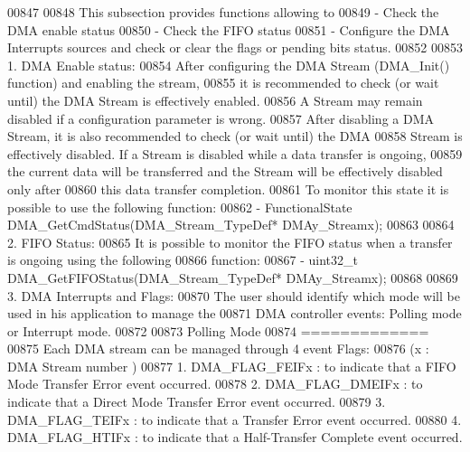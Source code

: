\begin{DoxyCode}
00847 \textcolor{comment}{}
00848 \textcolor{comment}{  This subsection provides functions allowing to}
00849 \textcolor{comment}{   - Check the DMA enable status}
00850 \textcolor{comment}{   - Check the FIFO status }
00851 \textcolor{comment}{   - Configure the DMA Interrupts sources and check or clear the flags or pending bits status.   }
00852 \textcolor{comment}{   }
00853 \textcolor{comment}{ 1. DMA Enable status:}
00854 \textcolor{comment}{   After configuring the DMA Stream (DMA\_Init() function) and enabling the stream,}
00855 \textcolor{comment}{   it is recommended to check (or wait until) the DMA Stream is effectively enabled.}
00856 \textcolor{comment}{   A Stream may remain disabled if a configuration parameter is wrong.}
00857 \textcolor{comment}{   After disabling a DMA Stream, it is also recommended to check (or wait until) the DMA}
00858 \textcolor{comment}{   Stream is effectively disabled. If a Stream is disabled while a data transfer is ongoing, }
00859 \textcolor{comment}{   the current data will be transferred and the Stream will be effectively disabled only after}
00860 \textcolor{comment}{   this data transfer completion.}
00861 \textcolor{comment}{   To monitor this state it is possible to use the following function:}
00862 \textcolor{comment}{     - FunctionalState DMA\_GetCmdStatus(DMA\_Stream\_TypeDef* DMAy\_Streamx); }
00863 \textcolor{comment}{ }
00864 \textcolor{comment}{ 2. FIFO Status:}
00865 \textcolor{comment}{   It is possible to monitor the FIFO status when a transfer is ongoing using the following }
00866 \textcolor{comment}{   function:}
00867 \textcolor{comment}{     - uint32\_t DMA\_GetFIFOStatus(DMA\_Stream\_TypeDef* DMAy\_Streamx); }
00868 \textcolor{comment}{ }
00869 \textcolor{comment}{ 3. DMA Interrupts and Flags:}
00870 \textcolor{comment}{  The user should identify which mode will be used in his application to manage the}
00871 \textcolor{comment}{  DMA controller events: Polling mode or Interrupt mode. }
00872 \textcolor{comment}{    }
00873 \textcolor{comment}{  Polling Mode}
00874 \textcolor{comment}{  =============}
00875 \textcolor{comment}{    Each DMA stream can be managed through 4 event Flags:}
00876 \textcolor{comment}{    (x : DMA Stream number )}
00877 \textcolor{comment}{       1. DMA\_FLAG\_FEIFx  : to indicate that a FIFO Mode Transfer Error event occurred.}
00878 \textcolor{comment}{       2. DMA\_FLAG\_DMEIFx : to indicate that a Direct Mode Transfer Error event occurred.}
00879 \textcolor{comment}{       3. DMA\_FLAG\_TEIFx  : to indicate that a Transfer Error event occurred.}
00880 \textcolor{comment}{       4. DMA\_FLAG\_HTIFx  : to indicate that a Half-Transfer Complete event occurred.}

\end{DoxyCode}
